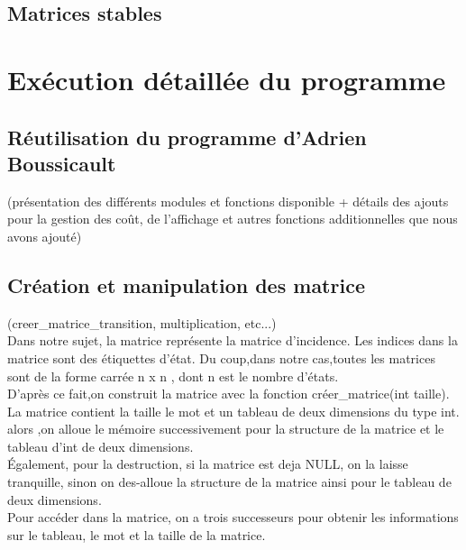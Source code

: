 \documentclass{report}
\begin{document}
\chapter{Matrices stables}

\part{Exécution détaillée du programme}

\chapter{Réutilisation du programme d'Adrien Boussicault}

(présentation des différents modules et fonctions disponible + détails des ajouts pour la gestion des coût, de l'affichage et autres fonctions additionnelles que nous avons ajouté)

\chapter{Création et manipulation des matrice}
(creer\_matrice\_transition, multiplication, etc...)\\


Dans notre sujet, la matrice représente la matrice d'incidence. Les indices dans la matrice sont des étiquettes d'état. Du coup,dans notre cas,toutes les matrices sont de la forme carrée n x n ,  dont n est le nombre d'états.\\

D'après ce fait,on construit la matrice avec la fonction créer\_matrice(int taille). La matrice contient la taille le mot et un tableau de deux dimensions du type int. alors ,on alloue le mémoire successivement pour la structure de la matrice et le tableau d'int de deux dimensions.\\

Également, pour la destruction, si la matrice est deja NULL, on la laisse tranquille, sinon on des-alloue la structure de la matrice ainsi pour le tableau de deux dimensions.\\

Pour accéder dans la matrice, on a trois successeurs pour obtenir les informations sur le tableau, le mot et la taille de la matrice. \\
\end{document}
